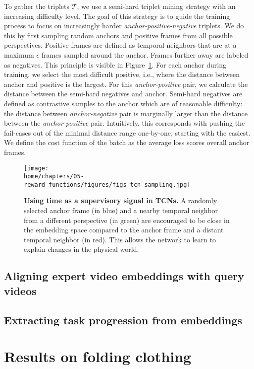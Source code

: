 \documentclass[\home/main.tex]{subfiles}
\begin{document}
To gather the triplets $\mathcal{T}$, we use a semi-hard triplet mining strategy with an increasing difficulty level. The goal of this strategy is to guide the training process to focus on increasingly harder \textit{anchor-positive-negative} triplets. We do this by first sampling random anchors and positive frames from all possible perspectives. Positive frames are defined as temporal neighbors that are at a maximum $\epsilon$ frames sampled around the anchor. Frames further away are labeled as negatives. This principle is visible in Figure~\ref{fig:triplet_mining}. For each anchor during training, we select the most difficult positive, i.e., where the distance between anchor and positive is the largest. For this \textit{anchor-positive} pair, we calculate the distance between the semi-hard negatives and anchor. Semi-hard negatives are defined as contrastive samples to the anchor which are of reasonable difficulty: the distance between \textit{anchor-negative} pair is marginally larger than the distance between the \textit{anchor-positive} pair. Intuitively, this corresponds with pushing the fail-cases out of the minimal distance range one-by-one, starting with the easiest. We define the cost function of the batch as the average loss scores overall anchor frames.

\begin{figure}[htbp]
    \centering
    \texttt{[image: \\home/chapters/05-reward\_functions/figures/figs\_tcn\_sampling.jpg]}
    \caption{\textbf{Using time as a supervisory signal in TCNs.} A randomly selected anchor frame (in blue) and a nearby temporal neighbor from a different perspective (in green) are encouraged to be close in the embedding space compared to the anchor frame and a distant temporal neighbor (in red). This allows the network to learn to explain changes in the physical world.}
    \label{fig:triplet_mining}
\end{figure}

\subsection{Aligning expert video embeddings with query videos}
\subsection{Extracting task progression from embeddings}

\section{Results on folding clothing}
\end{document}
